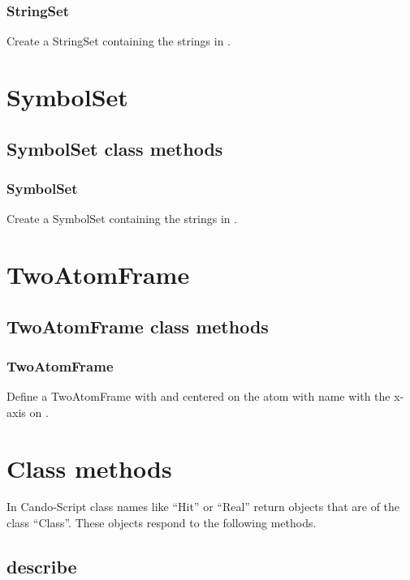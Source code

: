 \begin{itemize}
\subsubsection{StringSet}

Create a StringSet containing the strings in .

\section{SymbolSet}
\subsection{SymbolSet class methods}
\subsubsection{SymbolSet}

Create a SymbolSet containing the strings in .

\section{TwoAtomFrame}
\subsection{TwoAtomFrame class methods}
\subsubsection{TwoAtomFrame}

Define a TwoAtomFrame with  and centered on the atom with name 
with the x-axis on .


\section{Class methods}
In Cando-Script class names like ``Hit'' or ``Real'' return objects that are of the class ``Class''.  These objects respond to the following methods.

\subsection{describe}


\end{itemize}
